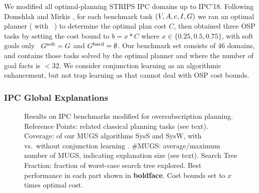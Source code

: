 We modified all optimal-planning STRIPS IPC domains up to
IPC'18. Following Domshlak and
Mirkis , for each benchmark task
$(V,A,{c},I,G)$ we ran an optimal planner (\astar
with \hlmcut\ \cite{helmert:domshlak:icaps-09}) to determine the
optimal plan cost $C$, then obtained three OSP tasks by setting the
cost bound to $b = x * C$ where $x \in \{0.25, 0.5, 0.75\}$, with soft
goals only \ie\ $G^{\text{\textup{soft}}} = G$ and $G^{\text{\textup{hard}}}=\emptyset$. Our
benchmark set consists of 46 domains, and contains those tasks solved
by the optimal planner and where the number of goal facts is $< 32$.
%
%
%
%
We consider conjunction learning as an algorithmic enhancement, but
not trap learning as that cannot deal with OSP cost bounds.
%


\subsubsection{IPC Global Explanations}

\setlength{\tabcolsep}{2pt}
\renewcommand{\arraystretch}{0.8}
\begin{figure*}[h!]
	\tiny
	\centering  
        \vspace{-0.2cm}
	\caption{Results on IPC benchmarks modified for oversubscription planning. Reference Points: related classical planning tasks (see text). Coverage: of our MUGS algorithms SysS and SysW, with vs.\ without conjunction learning \hc. \#MUGS: average/maximum number of MUGS, indicating explanation size (see text). Search Tree Fraction: fraction of worst-case search tree explored. Best performance in each part shown in \textbf{boldface}. Cost bounds set to $x$ times optimal cost.  }
	\label{table:coverage_ipc}
        \vspace{-0.5cm}
\end{figure*}

